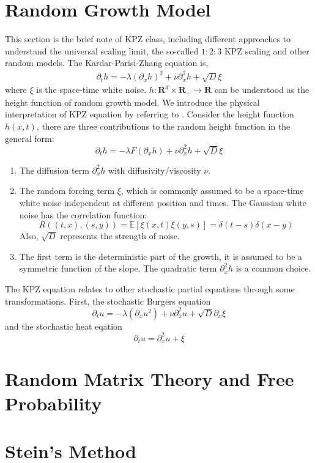 \documentclass[11pt,english]{smfart}
\newcommand{\mb}{\mathbb}
\newcommand{\mf}{\mathbf}
\begin{document}
\newpage
\section{Random Growth Model}
This section is the brief note of KPZ class, including different approaches to understand the universal scaling limit, the so-called $1:2:3$ KPZ scaling and other random models. The Kardar-Parisi-Zhang equation is, 
\begin{align}
    \partial_t h = -\lambda(\partial_x h)^2 + \nu \partial_x^2 h + \sqrt{D} \xi
\end{align}
where $\xi$ is the space-time white noise. $h:\mf{R}^d \times \mf{R}_+ \rightarrow \mf{R}$ can be understood as the height function of random growth model. We introduce the physical interpretation of KPZ equation by referring to \cite{Intro KPZ}. Consider the height function $h(x,t)$, there are three contributions to the random height function in the general form:
$$\partial_t h  = -\lambda F(\partial_xh) + \nu \partial^2_x h +\sqrt{D}\xi$$
\begin{enumerate}
    \item The diffusion term $\partial_x^2 h $ with diffusivity/viscosity $\nu$.
    \item The random forcing term $\xi$, which is commonly assumed to be a space-time white noise independent at different position and times. The Gaussian white noise has the correlation function: 
    $$R\left((t,x),(s,y)\right) = \mb{E}\left[\xi(x,t)\xi(y,s)\right] = \delta(t-s)\delta(x-y)$$
    Also, $\sqrt{D}$ represents the strength of noise.
    \item The first term is the deterministic part of the growth, it is assumed to be a symmetric function of the slope. The quadratic term $\partial_x^2h$ is a common choice.
\end{enumerate} 

The KPZ equation relates to other stochastic partial equations through some transformations. First, the stochastic Burgers equation
$$\partial_t u = -\lambda(\partial_x u^2) + \nu \partial_x^2 u + \sqrt{D}\partial_x \xi$$
and the stochastic heat eqation 
$$\partial_t u = \partial_x^2 u +\xi$$

\newpage 
\section{Random Matrix Theory and Free Probability}

\newpage
\section{Stein's Method}
\end{document}

